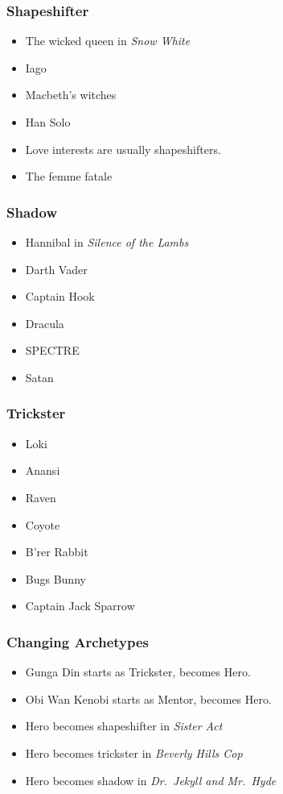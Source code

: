 \documentclass{beamer}
\newcommand{\bi}{\begin{itemize}}
\newcommand{\ei}{\end{itemize}}
\begin{document}
\begin{frame}\frametitle{Shapeshifter}
\bi
\item The wicked queen in {\em Snow White}
\item Iago
\item Macbeth's witches
\item Han Solo
\item Love interests are usually shapeshifters.
\item The femme fatale
\ei

\end{frame}
\begin{frame}\frametitle{Shadow}
\bi
\item Hannibal in {\em Silence of the Lambs}
\item Darth Vader
\item Captain Hook
\item Dracula
\item SPECTRE
\item Satan
\ei

\end{frame}
\begin{frame}\frametitle{Trickster}
\bi
\item Loki
\item Anansi
\item Raven
\item Coyote
\item B'rer Rabbit
\item Bugs Bunny
\item Captain Jack Sparrow
\ei

\end{frame}
\begin{frame}\frametitle{Changing Archetypes}
\bi
\item Gunga Din starts as Trickster, becomes Hero.
\item Obi Wan Kenobi starts as Mentor, becomes Hero.
\item Hero becomes shapeshifter in {\em Sister Act}
\item Hero becomes trickster in {\em Beverly Hills Cop}
\item Hero becomes shadow in {\em Dr.~Jekyll and Mr.~Hyde}
\ei

\end{frame}
\end{document}
